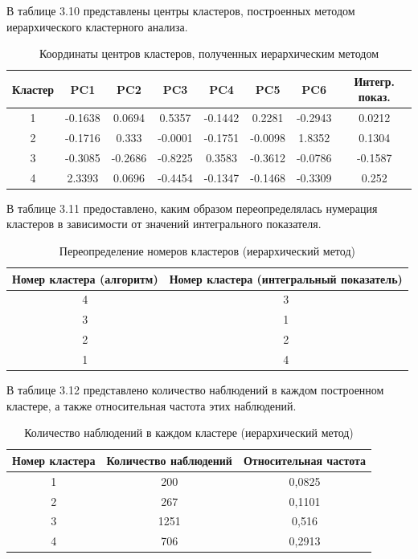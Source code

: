 \documentclass[14pt,a4paper]{extarticle}
\begin{document}
В таблице 3.10 представлены центры кластеров, построенных методом иерархического кластерного анализа.

\begin{table}[H]
    \centering
    \caption{Координаты центров кластеров, полученных иерархическим методом}
    \label{tab:hier_centers}
    \small
    \begin{tabular}{c|cccccc|c}
        \toprule
        Кластер & PC1 & PC2 & PC3 & PC4 & PC5 & PC6 & Интегр. показ. \\
        \midrule
        1 & -0.1638 & 0.0694  & 0.5357  & -0.1442 & 0.2281  & -0.2943 & 0.0212 \\
        2 & -0.1716 & 0.333   & -0.0001 & -0.1751 & -0.0098 & 1.8352  & 0.1304 \\
        3 & -0.3085 & -0.2686 & -0.8225 & 0.3583  & -0.3612 & -0.0786 & -0.1587 \\
        4 & 2.3393  & 0.0696  & -0.4454 & -0.1347 & -0.1468 & -0.3309 & 0.252 \\
        \bottomrule
    \end{tabular}
\end{table}

В таблице 3.11 предоставлено, каким образом переопределялась нумерация кластеров в зависимости от значений интегрального показателя.

\begin{table}[H]
    \centering
    \caption{Переопределение номеров кластеров (иерархический метод)}
    \label{tab:recode_hier}
    \begin{tabular}{cc}
        \toprule
        Номер кластера (алгоритм) & Номер кластера (интегральный показатель) \\
        \midrule
        4 & 3 \\
        3 & 1 \\
        2 & 2 \\
        1 & 4 \\
        \bottomrule
    \end{tabular}
\end{table}

В таблице 3.12 представлено количество наблюдений в каждом построенном кластере, а также относительная частота этих наблюдений.

\begin{table}[H]
    \centering
    \caption{Количество наблюдений в каждом кластере (иерархический метод)}
    \label{tab:counts_hier}
    \begin{tabular}{ccc}
        \toprule
        Номер кластера & Количество наблюдений & Относительная частота \\
        \midrule
        1 & 200  & 0,0825 \\
        2 & 267  & 0,1101 \\
        3 & 1251 & 0,516 \\
        4 & 706  & 0,2913 \\
        \bottomrule
    \end{tabular}
\end{table}
\end{document}
